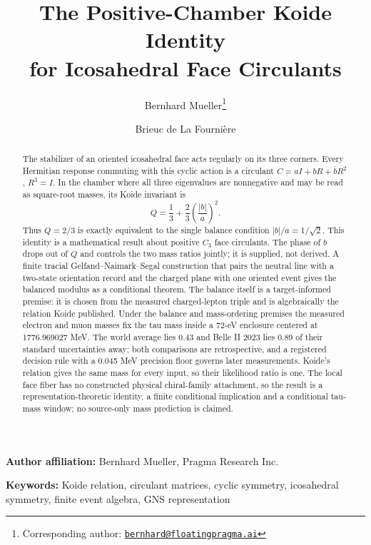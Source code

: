 \documentclass[11pt]{article}
\title{\textbf{The Positive-Chamber Koide Identity\\
for Icosahedral Face Circulants}}
\author{Bernhard Mueller\thanks{Corresponding author:
\href{mailto:bernhard@floatingpragma.ai}{\texttt{bernhard@floatingpragma.ai}}}
\and Brieuc de La Fourni\`ere}
\date{\OPHPaperReleaseDate}
\theoremstyle{remark}
\begin{document}
\maketitle
\OPHPaperReleaseBanner

\begin{center}
\small\textbf{Author affiliation:} Bernhard Mueller, Pragma Research Inc.
\end{center}

\begin{abstract}
The stabilizer of an oriented icosahedral face acts regularly on its three
corners. Every Hermitian response commuting with this cyclic action is a
circulant
\(C=aI+bR+\overline bR^2\), \(R^3=I\). In the chamber where all three
eigenvalues are nonnegative and may be read as square-root masses, its Koide
invariant is
\[
Q=\frac13+\frac23\left(\frac{|b|}{a}\right)^2.
\]
Thus \(Q=2/3\) is exactly equivalent to the single balance condition
\(|b|/a=1/\sqrt2\). This identity is a mathematical result about positive
\(C_3\) face circulants. The phase of \(b\) drops out of \(Q\) and controls
the two mass ratios jointly; it is supplied, not derived. A finite tracial
Gelfand--Naimark--Segal construction that pairs the neutral line with a
two-state orientation record and the charged plane with one oriented event
gives the balanced modulus as a conditional theorem. The balance itself is a
target-informed premise: it is chosen from the measured charged-lepton
triple and is algebraically the relation Koide published. Under the balance
and mass-ordering premises the measured electron and muon masses fix the tau
mass inside a 72-eV enclosure centered at 1776.969027 MeV. The world average
lies 0.43 and Belle II 2023 lies 0.89 of their standard uncertainties away;
both comparisons are retrospective, and a registered decision rule with a
0.045 MeV precision floor governs later measurements. Koide's relation gives
the same mass for every input, so their likelihood ratio is one. The local
face fiber has no constructed physical chiral-family attachment, so the
result is a representation-theoretic identity, a finite conditional
implication and a conditional tau-mass window; no source-only mass
prediction is claimed.
\end{abstract}

\noindent\textbf{Keywords:} Koide relation, circulant matrices, cyclic
symmetry, icosahedral symmetry, finite event algebra, GNS representation


\end{document}
